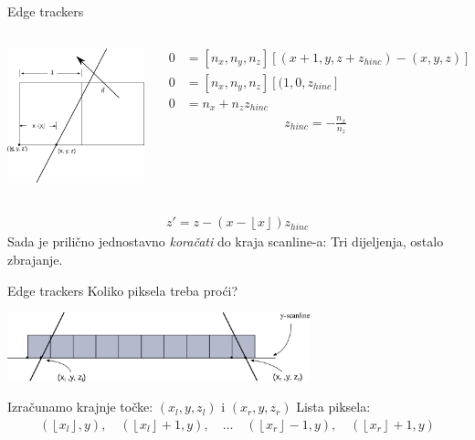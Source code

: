 \documentclass[9pt]{beamer}
\begin{document}
\begin{frame}{Edge trackers}
	\begin{columns}[t]
		\begin{column}{0.48 \textwidth}
			\begin{center}
				\includegraphics[height=4cm]{slike/p05_12.png}
			\end{center}
		\end{column}
		\begin{column}{0.48 \textwidth}
			\begin{align*}
			0 &= \left[n_x, n_y, n_z\right]\left[(x+1, y, z+z_{hinc}) - (x, y, z)\right]\\
			0 &= \left[n_x, n_y, n_z\right]\left[(1, 0, z_{hinc}\right]\\
			0 &= n_x+n_z z_{hinc}
			\end{align*}
			\begin{align*}
			z_{hinc} = -\frac{n_x}{n_z}
			\end{align*}
		\end{column}
	\end{columns}
	\begin{align*}
	z' = z-(x-\left\lfloor x\right\rfloor)z_{hinc}
	\end{align*}
	Sada je prilično jednostavno \textit{koračati} do kraja scanline-a:
	Tri dijeljenja, ostalo zbrajanje.
\end{frame}

\begin{frame}{Edge trackers}
	Koliko piksela treba proći?
	\begin{center}
		\includegraphics[height=2cm]{slike/p05_13.png}
	\end{center}
	Izračunamo krajnje točke: $(x_l, y, z_l)$ i $(x_r, y, z_r)$
	Lista piksela:
	\begin{align*}
	(\left\lfloor x_l\right\rfloor, y),\quad(\left\lfloor x_l\right\rfloor+1, y), \quad \ldots \quad
	(\left\lfloor x_r\right\rfloor-1, y), \quad(\left\lfloor x_r\right\rfloor+1, y)
	\end{align*}
\end{frame}
\end{document}
